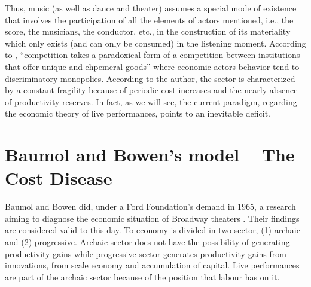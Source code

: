 \documentclass[a4paper, 12pt, openright, oneside, german, french, brazil, english, article]{abntex2}
\begin{document}
	Thus, music (as well as dance and theater) assumes a special mode of existence that involves the participation of all the elements of actors mentioned, i.e., the score, the musicians, the conductor, etc., in the construction of its materiality which only exists (and can only be consumed) in the listening moment. According to , ``competition takes a paradoxical form of a competition between institutions that offer unique and ehpemeral goods'' where economic actors behavior tend to discriminatory monopolies. According to the author, the sector is characterized by a constant fragility because of periodic cost increases and the nearly absence of productivity reserves. In fact, as we will see, the current paradigm, regarding the economic theory of live performances, points to an inevitable deficit.

	
	\section{Baumol and Bowen's model -- The Cost Disease}
	

	Baumol and Bowen did, under a Ford Foundation's demand in 1965, a research aiming to diagnose the economic situation of Broadway theaters \cite{benhamou2007economia}. Their findings are considered valid to this day. To  economy is divided in two sector, (1) archaic and (2) progressive. Archaic sector does not have the possibility of generating productivity gains while progressive sector generates productivity gains from innovations, from scale economy and accumulation of capital. Live performances are part of the archaic sector because of the position that labour has on it.


		
\end{document}
